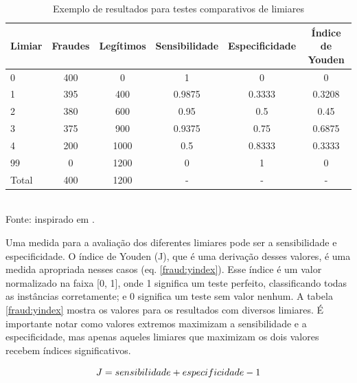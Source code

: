 \vspace{0.5cm}
\begin{table}[h!]
    \centering
    \caption{Exemplo de resultados para testes comparativos de limiares}
    \label{fraud:youden}
    \vspace{0.5cm}
    \begin{tabular}{l c c c c c}
        \hline
        Limiar & Fraudes & Legítimos & Sensibilidade & Especificidade & Índice de Youden \\
        \hline
        0     & 400 &    0 & 1      & 0      & 0      \\
        1     & 395 &  400 & 0.9875 & 0.3333 & 0.3208  \\
        2     & 380 &  600 & 0.95   & 0.5    & 0.45   \\
        3     & 375 &  900 & 0.9375 & 0.75   & 0.6875 \\
        4     & 200 & 1000 & 0.5    & 0.8333 & 0.3333 \\
        99    &   0 & 1200 & 0      & 1      & 0      \\
        \hline
        Total & 400 & 1200 &    -   &    -   &    -   \\
        \hline
    \end{tabular}
    \vspace{0.5cm}
    \\ Fonte: inspirado em \citet{Bewick2004}.
\end{table}
\vspace{0.5cm}

Uma medida para a avaliação dos diferentes limiares pode ser a sensibilidade e especificidade. O índice de Youden (J), que é uma derivação desses valores, é uma medida apropriada nesses casos (eq. \ref{fraud:yindex}). Esse índice é um valor normalizado na faixa [0, 1], onde 1 significa um teste perfeito, classificando todas as instâncias corretamente; e 0 significa um teste sem valor nenhum. A tabela \ref{fraud:yindex} mostra os valores para os resultados com diversos limiares. É importante notar como valores extremos maximizam a sensibilidade e a especificidade, mas apenas aqueles limiares que maximizam os dois valores recebem índices significativos.

\begin{equation}
    \vspace{2mm}
    J = sensibilidade + especificidade - 1
    \label{fraud:yindex}
    \vspace{2mm}
\end{equation}

